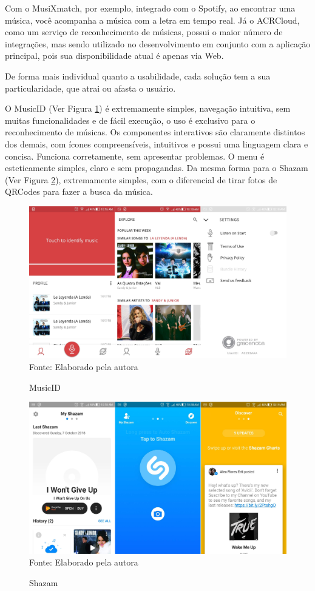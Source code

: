 Com o MusiXmatch, por exemplo, integrado com o Spotify, ao encontrar uma música, você acompanha a música com a letra em tempo real. Já o ACRCloud, como um serviço de reconhecimento de músicas, possui o maior número de integrações, mas sendo utilizado no desenvolvimento em conjunto com a aplicação principal, pois sua disponibilidade atual é apenas via Web.

De forma mais individual quanto a usabilidade, cada solução tem a sua particularidade, que atrai ou afasta o usuário.

O MusicID (Ver Figura \ref{fig:musicID}) é extremamente simples, navegação intuitiva, sem muitas funcionalidades e de fácil execução, o uso é exclusivo para o reconhecimento de músicas. Os componentes interativos são claramente distintos dos demais, com ícones compreensíveis, intuitivos e possui uma linguagem clara e concisa. Funciona corretamente, sem apresentar problemas. O menu é esteticamente simples, claro e sem propagandas. Da mesma forma para o Shazam (Ver Figura \ref{fig:shazam}), extremamente simples, com o diferencial de tirar fotos de QRCodes para fazer a busca da música.

\begin{figure}[!htb]
   \centering
   \caption{MusicID}\label{fig:musicID} 
   \includegraphics[scale=0.17]{figuras/MusicID.jpg}
   \\Fonte: Elaborado pela autora
\end{figure}

\begin{figure}[!htb]
   \centering
   \caption{Shazam}\label{fig:shazam} 
   \includegraphics[scale=0.17]{figuras/shazam.jpg}
   \\Fonte: Elaborado pela autora
\end{figure}

